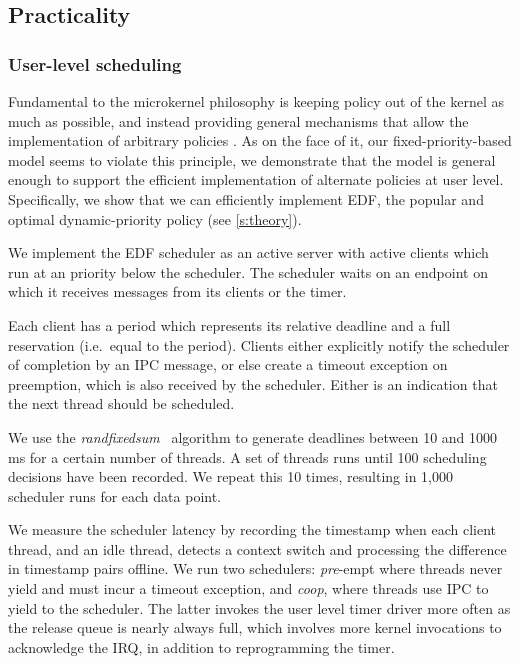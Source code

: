 \subsection{Practicality}

\subsubsection{User-level scheduling}\label{s:edf-impl}

Fundamental to the microkernel philosophy is keeping policy out of the
kernel as much as possible, and instead providing general mechanisms
that allow the implementation of arbitrary policies
\citep{Heiser_Elphinstone_16}.  As on the face of it, our
fixed-priority-based model seems to violate this principle,  we
demonstrate that the model is general enough to support the efficient
implementation of alternate policies at user level. Specifically, we
show that we can efficiently implement \gls{EDF}, the popular and  optimal dynamic-priority policy (see \autoref{s:theory}).

We implement the EDF scheduler as an active server with active
clients which run at an \selfour priority below the scheduler.
The scheduler waits on an endpoint on which it receives messages from
its clients or the timer.

Each client has a period which represents its relative deadline and a full reservation (i.e.\ equal to the period). Clients
either explicitly notify the scheduler of completion by an IPC
message, or else create a timeout exception on preemption, which is also received by the
scheduler. Either is an indication that the next thread should be scheduled.

We use the \emph{randfixedsum}~\citep{Emberson_SD_10} algorithm to
generate deadlines between 10 and 1000\,ms for a certain number of threads.
A set of threads runs until 100
scheduling decisions have been recorded. We repeat this 10 times,
resulting in 1,000 scheduler runs for each data point.

We measure the scheduler latency by recording the timestamp when each client thread, and an idle
thread, detects a
context switch and processing the difference in timestamp pairs offline. We run two schedulers:
\emph{pre}-empt where threads never yield and must incur a timeout exception, and \emph{coop}, where
threads use IPC to yield to the scheduler. The latter invokes the user level timer
driver more often as the release queue is nearly always full, which involves more kernel invocations
to acknowledge the IRQ, in addition to reprogramming the timer.

